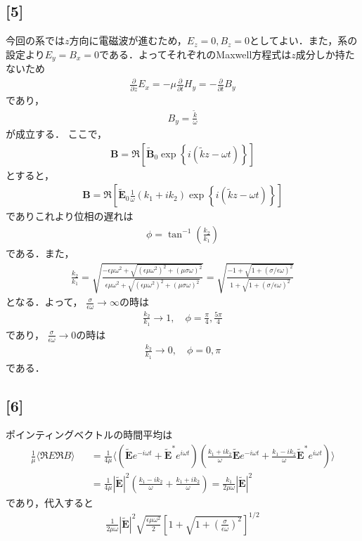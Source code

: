 \documentclass[12pt,dvipdfmx]{jsarticle}
\begin{document}
\subsection*{\large{[5]}}
今回の系では$z$方向に電磁波が進むため，$E_z=0,B_z=0$としてよい．また，系の設定より$E_y=B_x=0$である．よってそれぞれのMaxwell方程式は$z$成分しか持たないため
\begin{eqnarray}
  \frac{\partial}{\partial z}E_x = -\mu\frac{\partial}{\partial t}H_y = -\frac{\partial}{\partial t}B_y
\end{eqnarray}
であり，
\begin{eqnarray}
  B_y = \frac{\tilde{k}}{\omega}
\end{eqnarray}
が成立する．
ここで，
\begin{eqnarray}
  \bm{B} = \Re\left[ \tilde{\bm{B}}_0 \exp\left\{ i(\tilde{k}z-\omega t) \right\} \right]
\end{eqnarray}
とすると，
\begin{eqnarray}
  \bm{B} = \Re \left[ \tilde{\bm{E}}_0 \frac{1}{\omega}(k_1+ik_2)\exp\left\{ i(\tilde{k}z-\omega t) \right\} \right]
\end{eqnarray}
でありこれより位相の遅れは
\begin{eqnarray}
  \phi= \tan^{-1}\left( \frac{k_2}{k_1} \right)
\end{eqnarray}
である．また，
\begin{eqnarray}
  \frac{k_2}{k_1} = \sqrt{ \frac{-\epsilon\mu \omega^2+\sqrt{ (\epsilon\mu \omega^2)^2 + (\mu\sigma\omega)^2 }}{\epsilon\mu \omega^2+\sqrt{ (\epsilon\mu \omega^2)^2 + (\mu\sigma\omega)^2 }} }= \sqrt{ \frac{-1+ \sqrt{1+(\sigma/\epsilon\omega)^2}}{1+ \sqrt{1+(\sigma/\epsilon\omega)^2}} }
\end{eqnarray}
となる．よって，
$\frac{\sigma}{\epsilon\omega}\to\infty$の時は
\begin{eqnarray}
  \frac{k_2}{k_1} \to 1,\quad \phi= \frac{\pi}{4},\frac{5\pi}{4}
\end{eqnarray}
であり，
$\frac{\sigma}{\epsilon\omega}\to 0$の時は
\begin{eqnarray}
  \frac{k_2}{k_1} \to 0,\quad \phi= 0,\pi
\end{eqnarray}
である．
\subsection*{\large{[6]}}
ポインティングベクトルの時間平均は
\begin{eqnarray}
  \frac{1}{\mu}\langle \Re E \Re B \rangle &&= \frac{1}{4\mu}\langle ( \tilde{\bm{E}}e^{-i\omega t} +\tilde{\bm{E}}^{*}e^{i\omega t})( \frac{k_1+ik_2}{\omega}\tilde{\bm{E}}e^{-i\omega t} + \frac{k_1-ik_2}{\omega}\tilde{\bm{E}}^{*}e^{i\omega t} )\rangle\\
  &&=\frac{1}{4\mu}|\tilde{\bm{E}}|^2 \left( \frac{k_1-ik_2}{\omega} + \frac{k_1+ik_2}{\omega} \right) = \frac{k_1}{2\mu\omega} |\tilde{\bm{E}}|^2
\end{eqnarray}
であり，代入すると
\begin{eqnarray}
  \frac{1}{2\mu\omega} |\tilde{\bm{E}}|^2 \sqrt{\frac{\epsilon\mu\omega^2}{2}}\left[ 1+\sqrt{1+\left(\frac{\sigma}{\epsilon\omega}\right)^2} \right]^{1/2}
\end{eqnarray}
\end{document}
